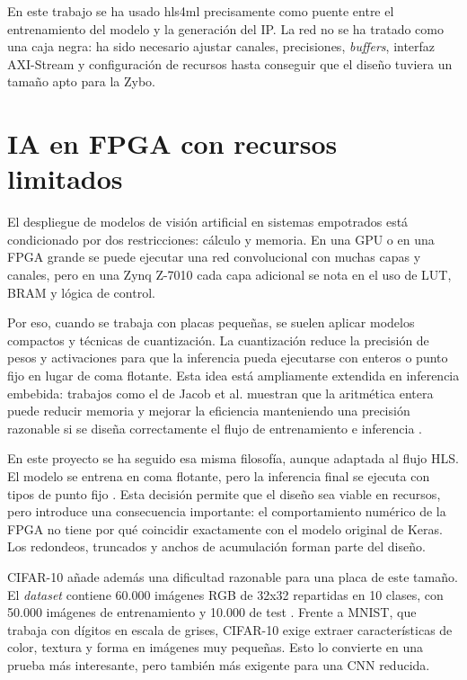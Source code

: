 En este trabajo se ha usado hls4ml precisamente como puente entre el entrenamiento del modelo y la
generación del \ac{IP}. La red no se ha tratado como una caja negra: ha sido necesario
ajustar canales,
precisiones, \textit{buffers}, interfaz \ac{AXI}-Stream y configuración de recursos hasta
conseguir que el diseño
tuviera un tamaño apto para la Zybo.

\section{IA en FPGA con recursos limitados}
El despliegue de modelos de visión artificial en sistemas empotrados está condicionado por dos
restricciones: cálculo y memoria. En una \ac{GPU} o en una \ac{FPGA} grande se puede
ejecutar una red
convolucional con muchas capas y canales, pero en una Zynq Z-7010 cada capa adicional se nota en el
uso de \ac{LUT}, \ac{BRAM} y lógica de control.

Por eso, cuando se trabaja con placas pequeñas, se suelen aplicar modelos compactos y técnicas de
cuantización. La cuantización reduce la precisión de pesos y activaciones para que la inferencia
pueda ejecutarse con enteros o punto fijo en lugar de coma flotante. Esta idea está ampliamente
extendida en inferencia embebida: trabajos como el de Jacob et al. muestran que la aritmética
entera puede reducir memoria y mejorar la eficiencia manteniendo una precisión razonable si se
diseña correctamente el flujo de entrenamiento e inferencia \citep{Jacob_2018_CVPR}.

En este proyecto se ha seguido esa misma filosofía, aunque adaptada al flujo \ac{HLS}. El modelo se
entrena en coma flotante, pero la inferencia final se ejecuta con tipos de punto fijo
\citep{amdPrecisionFixedPoint}. Esta
decisión permite que el diseño sea viable en recursos, pero introduce una consecuencia importante:
el comportamiento numérico de la \ac{FPGA} no tiene por qué coincidir exactamente con el
modelo original
de Keras. Los redondeos, truncados y anchos de acumulación forman parte del diseño.

\ac{CIFAR}-10 añade además una dificultad razonable para una placa de este tamaño. El
\textit{dataset} contiene
60.000 imágenes \ac{RGB} de 32x32 repartidas en 10 clases, con 50.000 imágenes de entrenamiento y
10.000 de test \citep{cifar10Dataset}. Frente a \ac{MNIST}, que trabaja con dígitos en
escala de grises,
\ac{CIFAR}-10 exige extraer características de color, textura y forma en imágenes muy
pequeñas. Esto lo
convierte en una prueba más interesante, pero también más exigente para una \ac{CNN} reducida.

